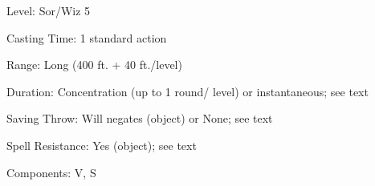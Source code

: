 
\begin{description*}
\item[Level:] Sor/Wiz 5
\item[Casting Time:] 1 standard action
\item[Range:] Long (400 ft. + 40 ft./level)
\item[Duration:] Concentration (up to 1 round/ level) or instantaneous; see text
\item[Saving Throw:] Will negates (object) or None; see text
\item[Spell Resistance:] Yes (object); see text
\item[Components:] V, S
\end{description*}

